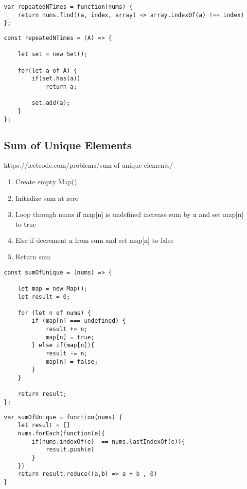\documentclass[10pt]{article}
\begin{document}
\begin{lstlisting}[title=Solution repeatedNTimes with ES6, captionpos=t]
var repeatedNTimes = function(nums) {
    return nums.find((a, index, array) => array.indexOf(a) !== index)
};
\end{lstlisting}

\begin{lstlisting}[title=Solution repeatedNTimes with Set(), captionpos=t]
const repeatedNTimes = (A) => {

    let set = new Set();
    
    for(let a of A) {
        if(set.has(a))
            return a;
        
        set.add(a);
    }
};
\end{lstlisting}

\medskip %







\pagebreak %
\medskip   
\subsection{Sum of Unique Elements}
https://leetcode.com/problems/sum-of-unique-elements/

\begin{enumerate}
	\item Create empty Map()
	\item Initialize sum at zero 
	\item Loop through nums if map[n] is undefined increase sum by n and set map[n] to true
	\item Else if decrement n from sum and set map[n] to false 
	\item Return sum 
\end{enumerate}

\begin{lstlisting}[title=Solution sumOfUnique with Map(), captionpos=t]
const sumOfUnique = (nums) => {

    let map = new Map();
    let result = 0;
    
    for (let n of nums) {
        if (map[n] === undefined) {
            result += n;
            map[n] = true;
        } else if(map[n]){
            result -= n;
            map[n] = false;
        }
    }
    
    return result;
};
\end{lstlisting}

\begin{lstlisting}[title=Solution sumOfUnique with forEach, captionpos=t]
var sumOfUnique = function(nums) {
    let result = []
    nums.forEach(function(e){
        if(nums.indexOf(e)  == nums.lastIndexOf(e)){
            result.push(e)
        } 
    })
    return result.reduce((a,b) => a + b , 0)
}
\end{lstlisting}
\medskip %
\end{document}
